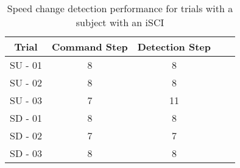\begin{table}[tb]
		\centering
		\caption{Speed change detection performance for trials with a subject with an iSCI} \label{table:nab_results_ag}
		\small
		\begin{tabular}{|c|c|c|c|c|}
			\hline 
			Trial	& Command Step & Detection Step \\ 
			\hline 
			SU - 01	& 8 & 8 \\ 
			\hline 
			SU - 02	& 8 & 8 \\ 
			\hline 
			SU - 03	& 7 & 11 \\ 
			\hline 
			SD - 01	& 8 & 8 \\ 
			\hline 
			SD - 02	& 7 & 7 \\ 
			\hline 
			SD - 03	& 8 & 8 \\ 
			\hline 
		\end{tabular} 
\end{table}